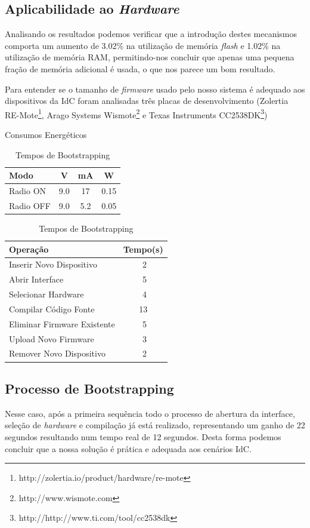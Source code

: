 \documentclass{llncs}
\begin{document}
\subsection{Aplicabilidade ao \textit{Hardware}}

Analisando os resultados podemos verificar que a introdução destes mecanismos comporta um aumento de 3.02\% na utilização de memória \textit{flash} e 1.02\% na utilização de memória \ac{RAM}, permitindo-nos concluir que apenas uma pequena fração de memória adicional é usada, o que nos parece um bom resultado.

Para entender se o tamanho de \textit{firmware} usado pelo nosso sistema é adequado aos dispositivos da \ac{IdC} foram analisadas três placas de desenvolvimento (Zolertia RE-Mote\footnote{http://zolertia.io/product/hardware/re-mote}, Arago Systems Wismote\footnote{http://www.wismote.com} e Texas Instruments CC2538DK\footnote{http://http://www.ti.com/tool/cc2538dk})


\begin{table}
\parbox{.45\linewidth}{
\centering
\caption{Consumos Energéticos}
\label{tab:power_consumptions}
\begin{tabular}{|l|c|c|c|} \hline
Modo&V&mA&W\\ \hline
Radio ON& 9.0& 17&0.15\\ \hline
Radio OFF& 9.0& 5.2&0.05\\ 
\hline\end{tabular}
}
\hfill
\parbox{.55\linewidth}{
\centering
\caption{Tempos de Bootstrapping}
\label{tab:bootstrapping_time}
\begin{tabular}{|l|c|} \hline
Operação&Tempo(s)\\ \hline
Inserir Novo Dispositivo&\,\,2\\ \hline
Abrir Interface&\,\,5\\ \hline
Selecionar Hardware&\,\,4\\ \hline
Compilar Código Fonte&13\\ \hline
Eliminar Firmware Existente&\,\,5\\ \hline
Upload Novo Firmware&\,\,3\\ \hline
Remover Novo Dispositivo&\,\,2\\ 
\hline\end{tabular}
}
\end{table}

\subsection{Processo de Bootstrapping}
Nesse caso, após a primeira sequência todo o processo de abertura da interface, seleção de \textit{hardware} e compilação já está realizado, representando um ganho de 22 segundos resultando num tempo real de 12 segundos. 
Desta forma podemos concluir que a nossa solução é prática e adequada aos cenários \ac{IdC}.
\end{document}
